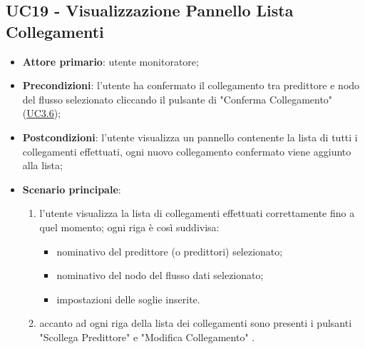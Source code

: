 	

	\label{par:UC19}
	\subsection{UC19 - Visualizzazione Pannello Lista Collegamenti}
		\begin{itemize}
			\item\textbf{Attore primario}: utente monitoratore;
			\item\textbf{Precondizioni}: l’utente ha confermato il collegamento tra predittore e nodo del flusso selezionato cliccando il pulsante di "Conferma Collegamento" (\hyperref[par:UC3.6]{UC3.6});
			\item\textbf{Postcondizioni}: l’utente visualizza un pannello contenente la lista di tutti i collegamenti effettuati, ogni nuovo collegamento confermato viene aggiunto alla lista; 
			\item\textbf{Scenario principale}: 
				\begin{enumerate} 
					\item l'utente visualizza la lista di collegamenti effettuati correttamente fino a quel momento; ogni riga è così suddivisa:
					\begin{itemize}
						\item nominativo del predittore (o predittori) selezionato;
						\item nominativo del nodo del flusso dati selezionato;
						\item impostazioni delle soglie inserite.
					\end{itemize}
					\item accanto ad ogni riga della lista dei collegamenti sono presenti i pulsanti "Scollega Predittore" e "Modifica Collegamento" .	
				\end{enumerate}		
		\end{itemize}


	\label{par:UC20}
